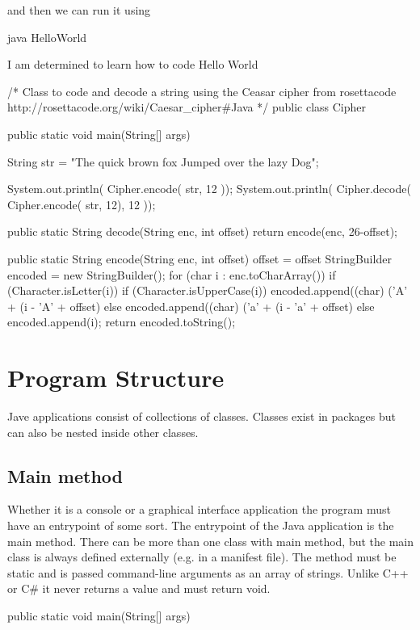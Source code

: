 and then we can run it using


\begin{bashcode}

 java HelloWorld
 
 I am determined to learn how to code
 Hello World
\end{bashcode}


\begin{javacode}
/*
 Class to code and decode a string using the Ceasar cipher
 from rosettacode http://rosettacode.org/wiki/Caesar_cipher#Java
*/
public class Cipher {
    public static void main(String[] args) {
 
        String str = "The quick brown fox Jumped over the lazy Dog";
 
        System.out.println( Cipher.encode( str, 12 ));
        System.out.println( Cipher.decode( Cipher.encode( str, 12), 12 ));
    }
 
    public static String decode(String enc, int offset) {
        return encode(enc, 26-offset);
    }
 
    public static String encode(String enc, int offset) {
        offset = offset %
        StringBuilder encoded = new StringBuilder();
        for (char i : enc.toCharArray()) {
            if (Character.isLetter(i)) {
                if (Character.isUpperCase(i)) {
                    encoded.append((char) ('A' + (i - 'A' + offset) %
                } else {
                    encoded.append((char) ('a' + (i - 'a' + offset) %
                }
            } else {
                encoded.append(i);
            }
        }
        return encoded.toString();
    }
}
\end{javacode}


\section{Program Structure}

Jave applications consist of collections of classes. Classes exist in packages but can also be nested inside other classes.

\subsection{Main method}
Whether it is a console or a graphical interface application the program must have an entrypoint of some sort. The entrypoint of the Java application is the main method. There can be more than one class with main method, but the main class is always defined externally (e.g. in a manifest file). The method must be static and is passed command-line arguments as an array of strings. Unlike C++ or C\# it never returns a value and must return void.

\begin{javacode}
public static void main(String[] args) {
}
\end{javacode}








